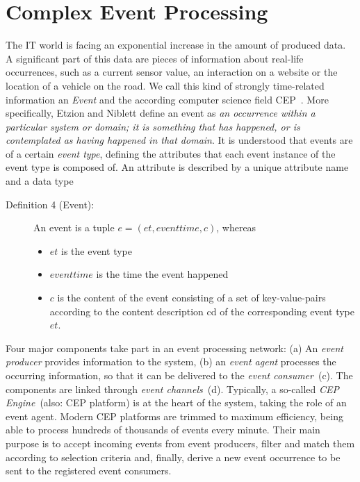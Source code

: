 \section{Complex Event Processing}\label{ch:bg:cep}
The IT world is facing an exponential increase in the amount of produced data. A significant part of this data are pieces of information about real-life occurrences, such as a current sensor value, an interaction on a website or the location of a vehicle on the road.
We call this kind of strongly time-related information an \textit{Event} and the according computer science field \acf{CEP}~\cite{evtprocessing}.
More specifically, Etzion and Niblett define an event as \textit{an occurrence within a particular system or domain; it is something that has happened, or is contemplated as having happened in that domain}.
It is understood that events are of a certain \textit{event type}, defining the attributes that each event instance of the event type is composed of. An attribute is described by a unique attribute name and a data type

\pagebreak

\begin{description}
	\item[Definition 4 (Event):]
	An event is a tuple $e = (et, eventtime, c)$, whereas
	\begin{itemize} 
		\item
		$et$ is the event type
		\item 
		$eventtime$ is the time the event happened
		\item
		$c$ is the content of the event consisting of a set of key-value-pairs according to the content description cd of the corresponding event type $et$.
	\end{itemize}
\end{description}


Four major components take part in an event processing network: (a) An \textit{event producer} provides information to the system, (b) an \textit{event agent} processes the occurring information, so that it can be delivered to the \textit{event consumer}~(c). The components are linked through \textit{event channels}~(d).
Typically, a so-called \textit{\acs{CEP} Engine}~(also: CEP platform) is at the heart of the system, taking the role of an event agent.
Modern CEP platforms are trimmed to maximum efficiency, being able to process hundreds of thousands of events every minute.
Their main purpose is to accept incoming events from event producers, filter and match them according to selection criteria and, finally, derive a new event occurrence to be sent to the registered event consumers.

